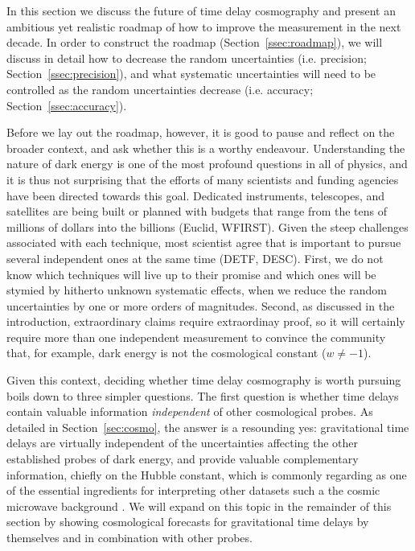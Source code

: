 


In this section we discuss the future of time delay cosmography and
present an ambitious yet realistic roadmap of how to improve the
measurement in the next decade. In order to construct the roadmap
(Section~\ref{ssec:roadmap}), we will discuss in detail how to
decrease the random uncertainties (i.e. precision;
Section~\ref{ssec:precision}), and what systematic uncertainties will
need to be controlled as the random uncertainties decrease
(i.e. accuracy; Section~\ref{ssec:accuracy}).

Before we lay out the roadmap, however, it is good to pause and
reflect on the broader context, and ask whether this is a worthy
endeavour.  Understanding the nature of dark energy is one of the most
profound questions in all of physics, and it is thus not surprising
that the efforts of many scientists and funding agencies have been
directed towards this goal. Dedicated instruments, telescopes, and
satellites are being built or planned with budgets that range from the
tens of millions of dollars into the billions (Euclid, WFIRST). Given
the steep challenges associated with each technique, most scientist
agree that is important to pursue several independent ones at the same
time (DETF, DESC). First, we do not know which techniques will live up
to their promise and which ones will be stymied by hitherto unknown
systematic effects, when we reduce the random uncertainties by one or
more orders of magnitudes. Second, as discussed in the introduction,
extraordinary claims require extraordinay proof, so it will certainly
require more than one independent measurement to convince the
community that, for example, dark energy is not the cosmological
constant ($w\neq-1$).

Given this context, deciding whether time delay cosmography is worth
pursuing boils down to three simpler questions. The first question is
whether time delays contain valuable information {\it independent} of
other cosmological probes. As detailed in Section~\ref{sec:cosmo}, the
answer is a resounding yes: gravitational time delays are virtually
independent of the uncertainties affecting the other established
probes of dark energy, and provide valuable complementary information,
chiefly on the Hubble constant, which is commonly regarding as one of
the essential ingredients for interpreting other datasets such a the
cosmic microwave background \citep{Hu05,Suy++12,Wei++13,Rie++16}.  We
will expand on this topic in the remainder of this section by showing
cosmological forecasts for gravitational time delays by themselves and
in combination with other probes.

